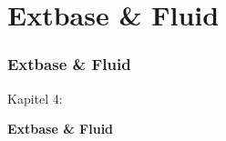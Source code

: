 %

\section{Extbase \& Fluid}
\begin{frame}[fragile]
	\frametitle{Extbase \& Fluid}

	\begin{center}\huge{Kapitel 4:}\end{center}
	\begin{center}\huge{\color{typo3darkgrey}\textbf{Extbase \& Fluid}}\end{center}

\end{frame}

